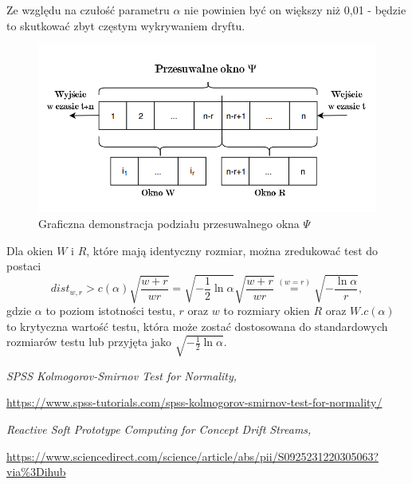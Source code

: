 \documentclass{classrep}
\begin{document}
Ze względu na czułość parametru $\alpha$ nie powinien być on większy niż 0,01 - będzie to skutkować zbyt częstym wykrywaniem dryftu. 

\begin{figure}[H]
    \centering
    \includegraphics[width=1\textwidth]{resources/kswin/okno.png}
    \caption{Graficzna demonstracja podziału przesuwalnego okna $\Psi$}
    \label{DDM}
\end{figure}

Dla okien $W$ i $R$, które mają identyczny rozmiar, można zredukować test do postaci
\begin{equation}
dist_{w,r} > c(\alpha) \sqrt{\frac{w+r}{wr}} = \sqrt{-\frac{1}{2}\ln{\alpha}} \sqrt{\frac{w+r}{wr}} \overset{(w=r)}{=} \sqrt{-\frac{\ln{\alpha}}{r}},
\end{equation}
gdzie $\alpha$ to poziom istotności testu, $r$ oraz $w$ to rozmiary okien $R$ oraz $W$.$c(\alpha)$ to krytyczna wartość testu, która może zostać dostosowana do standardowych rozmiarów testu lub przyjęta jako $\sqrt{-\frac{1}{2}\ln{\alpha}}$. 

\newpage
\nocite{*}
\begin{thebibliography}{}

    \textsl{SPSS Kolmogorov-Smirnov Test for Normality, }
    \author{Ruben Geert van den Berg. }
    \url{ https://www.spss-tutorials.com/spss-kolmogorov-smirnov-test-for-normality/}
    \text{ [dostęp: 04.01.2021]}

    \textsl{Reactive Soft Prototype Computing for Concept Drift Streams, }
    \author{Christoph Raab, Moritz Heusinger, Frank-Michael Schleif. }
    \url{ https://www.sciencedirect.com/science/article/abs/pii/S0925231220305063?via\%3Dihub}
    \text{ [dostęp: 04.01.2021]}

\end{thebibliography}
\end{document}
